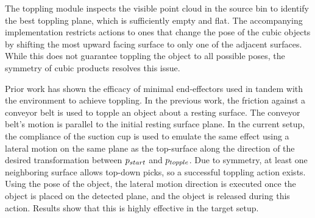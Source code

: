 The toppling module inspects the visible point cloud in the source bin to identify the best toppling plane, which is sufficiently empty and flat. The accompanying implementation restricts actions to ones that change the pose of the cubic objects by shifting the most upward facing surface to only one of the adjacent surfaces. While this does not guarantee toppling the object to all possible poses, the symmetry of cubic products resolves this issue. 

Prior work \cite{lynch1999toppling} has shown the efficacy of minimal end-effectors used in tandem with the environment to achieve toppling. In the previous work, the friction against a conveyor belt is used to topple an object about a resting surface. The conveyor belt's motion is parallel to the initial resting surface plane. In the current setup, the compliance of the suction cup is used to emulate the same effect using a lateral motion on the same plane as the top-surface along the direction of the desired transformation between $p_{start}$ and $p_{topple}$. Due to symmetry, at least one neighboring surface allows top-down picks, so a successful toppling action exists. Using the pose of the object, the lateral motion direction is executed once the object is placed on the detected plane, and the object is released during this action. Results show that this is highly effective in the target setup.






